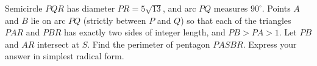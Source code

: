 Semicircle $PQR$ has diameter $PR=5\sqrt{13}$, and arc $PQ$ measures $90^\circ$. Points $A$ and $B$ lie on arc $PQ$ (strictly between $P$ and $Q$) so that each of the triangles $PAR$ and $PBR$ has exactly two sides of integer length, and $PB>PA>1$. Let $PB$ and $AR$ intersect at $S$. Find the perimeter of pentagon $PASBR$. Express your answer in simplest radical form.
